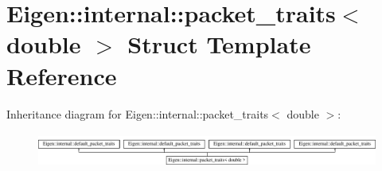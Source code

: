 \hypertarget{struct_eigen_1_1internal_1_1packet__traits_3_01double_01_4}{}\section{Eigen\+::internal\+::packet\+\_\+traits$<$ double $>$ Struct Template Reference}
\label{struct_eigen_1_1internal_1_1packet__traits_3_01double_01_4}
Inheritance diagram for Eigen\+::internal\+::packet\+\_\+traits$<$ double $>$\+:\begin{figure}[H]
\begin{center}
\leavevmode
\includegraphics[height=1.171548cm]{struct_eigen_1_1internal_1_1packet__traits_3_01double_01_4}
\end{center}
\end{figure}
